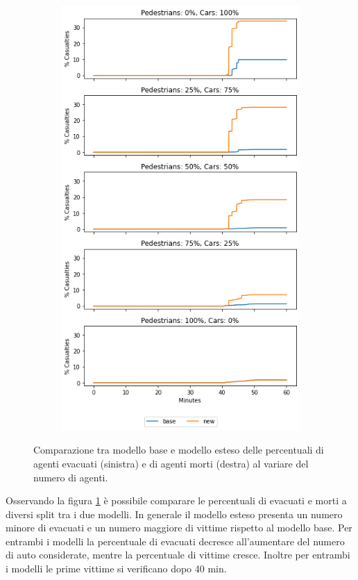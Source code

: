 \begin{figure}[ht]
\begin{subfigure}{0.45\textwidth}
        \includegraphics[width=\textwidth]{images/analisi/comparison-total-casualties.png}
    \end{subfigure}
    \caption{Comparazione tra modello base e modello esteso delle percentuali di agenti evacuati (sinistra) e di agenti morti (destra) al variare del numero di agenti.}
    \label{fig:analisi-comparison-total-ec}
\end{figure}

Osservando la figura \ref{fig:analisi-comparison-total-ec} è possibile comparare le percentuali di evacuati e morti a diversi split tra i due modelli.
In generale il modello esteso presenta un numero minore di evacuati e un numero maggiore di vittime rispetto al modello base.
Per entrambi i modelli la percentuale di evacuati decresce all'aumentare del numero di auto considerate, mentre la percentuale di vittime cresce.
Inoltre per entrambi i modelli le prime vittime si verificano dopo 40 min.

